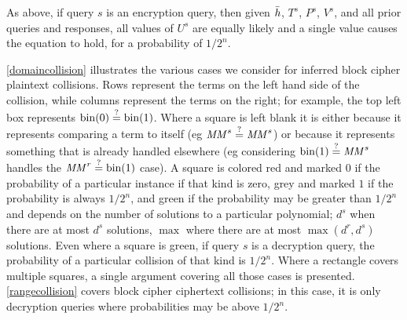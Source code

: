 \documentclass[hctr2.tex]{subfiles}
\begin{document}
As above, if query \(s\) is an encryption query,
then given \(\bar{h}\), \(T^s\), \(P^s\), \(V^s\),
and all prior queries and responses,
all values of \(U^s\) are equally likely
and a single value causes the equation to hold,
for a probability of \(1/2^n\).

\autoref{domaincollision} illustrates the various cases
we consider for inferred block cipher plaintext collisions.
Rows represent the terms
on the left hand side of the collision, while
columns represent the terms on the right; 
for example, the top left box represents
\(\operatorname{bin}(0) \stackrel{\text{?}}{=} \operatorname{bin}(1)\). Where a square is left blank
it is either because it represents
comparing a term to itself (eg \(\mathit{MM}^s \stackrel{\text{?}}{=} \mathit{MM}^s\))
or because it represents something that
is already handled elsewhere
(eg considering \(\operatorname{bin}(1) \stackrel{\text{?}}{=} \mathit{MM}^s\)
handles the \(\mathit{MM}^r \stackrel{\text{?}}{=} \operatorname{bin}(1)\) case).
A square is colored red
and marked \(0\) if the
probability of a particular instance
if that kind is zero, grey
and marked \(1\) if
the probability is always \(1/2^n\),
and green if the probability may be
greater than \(1/2^n\) and depends
on the number of solutions to a
particular polynomial;
\(d^s\) when there are at most \(d^s\) solutions,
\(\max\) where there are at most
\(\max(d^r, d^s)\) solutions.
Even where a square is green,
if query \(s\) is a decryption query,
the probability of a particular collision of
that kind is \(1/2^n\).
Where a rectangle covers
multiple squares, a single argument
covering all those cases is presented.
\autoref{rangecollision} covers
block cipher ciphertext collisions; in this case,
it is only decryption queries where
probabilities may be above \(1/2^n\).
\end{document}

